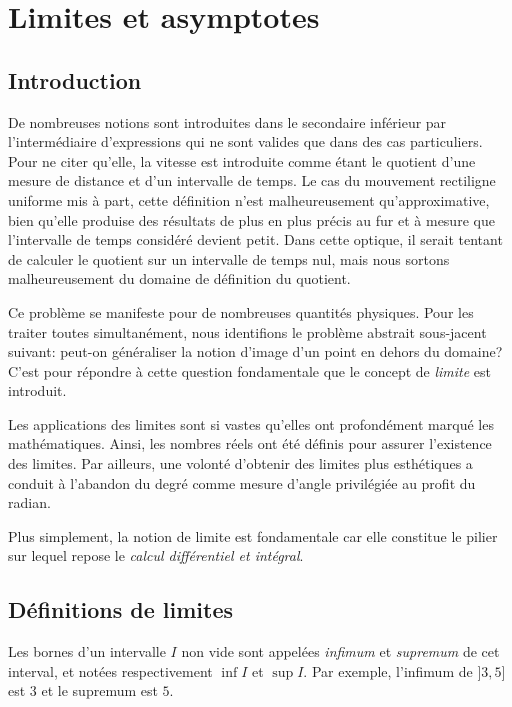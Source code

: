 \documentclass[main.tex]{subfiles}
\begin{document}
\chapter{Limites et asymptotes}

\section{Introduction}

De nombreuses notions sont introduites dans le secondaire inférieur par l'intermédiaire d'expressions
qui ne sont valides que dans des cas particuliers.
Pour ne citer qu'elle,
la vitesse est introduite comme étant le quotient d'une mesure de distance et d'un intervalle de temps.
Le cas du mouvement rectiligne uniforme mis à part,
cette définition n'est malheureusement qu'approximative,
bien qu'elle produise des résultats de plus en plus précis
au fur et à mesure que l'intervalle de temps considéré devient petit.
Dans cette optique,
il serait tentant de calculer le quotient sur un intervalle de temps nul,
mais nous sortons malheureusement du domaine de définition du quotient.

Ce problème se manifeste pour de nombreuses quantités physiques.
Pour les traiter toutes simultanément,
nous identifions le problème abstrait sous-jacent suivant:
peut-on généraliser la notion d'image d'un point en dehors du domaine?
C'est pour répondre à cette question fondamentale que le concept de \emph{limite} est introduit.

Les applications des limites sont si vastes
qu'elles ont profondément marqué les mathématiques.
Ainsi, les nombres réels ont été définis pour assurer l'existence des limites.
Par ailleurs,
une volonté d'obtenir des limites plus esthétiques a conduit à l'abandon du degré comme mesure d'angle privilégiée au profit du radian.

Plus simplement,
la notion de limite est fondamentale
car elle constitue le pilier sur lequel repose le \emph{calcul différentiel et intégral}.

\section{Définitions de limites}

Les bornes d'un intervalle $I$ non vide sont appelées \emph{infimum} et \emph{supremum} de cet interval,
et notées respectivement $\inf I$ et $\sup I$.
Par exemple, l'infimum de $]3, 5]$ est $3$ et le supremum est $5$.
\end{document}

